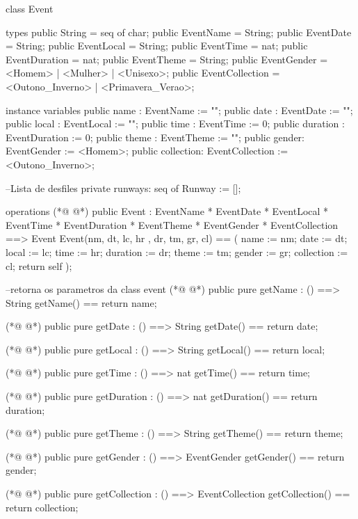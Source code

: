 \begin{vdmpp}[breaklines=true]
class Event
 
types
 public String = seq of char; 
 public EventName = String;
 public EventDate = String;
 public EventLocal = String;
 public EventTime = nat;
 public EventDuration = nat;
 public EventTheme = String;
 public EventGender = <Homem> | <Mulher> | <Unisexo>;
  public EventCollection = <Outono_Inverno> | <Primavera_Verao>;

instance variables
 public  name : EventName := "";
 public  date : EventDate := "";
 public  local : EventLocal := "";
 public  time : EventTime := 0;
 public  duration : EventDuration := 0;
 public  theme : EventTheme := "";
 public  gender: EventGender := <Homem>;
 public  collection: EventCollection := <Outono_Inverno>;
 
 --Lista de desfiles
 private runways: seq of Runway := [];
 
operations
(*@
\label{Event:28}
@*)
 public Event : 
         EventName * 
         EventDate *
         EventLocal *
         EventTime *
         EventDuration *
         EventTheme *
         EventGender *  
         EventCollection ==> Event
 Event(nm, dt, lc, hr , dr, tm, gr, cl) == (
  name := nm;
  date := dt;
  local := lc;
  time := hr;
  duration := dr;
  theme := tm;
  gender := gr;
  collection := cl;
  return self
 );
 
 --retorna os parametros da class event
(*@
\label{getName:50}
@*)
  public pure getName : () ==> String
    getName() == return name;
    
(*@
\label{getDate:53}
@*)
   public pure getDate : () ==> String
     getDate() == return date;
     
(*@
\label{getLocal:56}
@*)
  public pure getLocal : () ==> String
     getLocal() == return local;
     
(*@
\label{getTime:59}
@*)
  public pure getTime : () ==> nat
     getTime() == return time;      
     
(*@
\label{getDuration:62}
@*)
  public pure getDuration : () ==> nat
     getDuration() == return duration;
     
(*@
\label{getTheme:65}
@*)
  public pure getTheme : () ==> String
     getTheme() == return theme;
     
(*@
\label{getGender:68}
@*)
  public pure getGender : () ==> EventGender
     getGender() == return gender;
     
(*@
\label{getCollection:71}
@*)
  public pure getCollection : () ==> EventCollection
     getCollection() == return collection;
  

\end{vdmpp}
